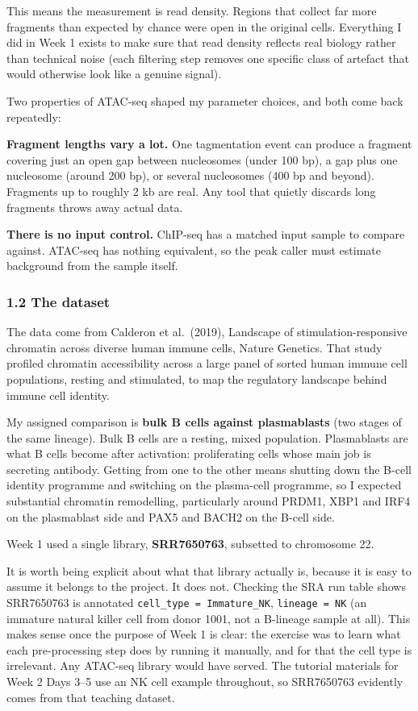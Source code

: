 \documentclass[
  11pt,
  a4paper,
]{article}
\begin{document}
This means the measurement is read density. Regions that collect far
more fragments than expected by chance were open in the original cells.
Everything I did in Week 1 exists to make sure that read density
reflects real biology rather than technical noise (each filtering step
removes one specific class of artefact that would otherwise look like a
genuine signal).

Two properties of ATAC-seq shaped my parameter choices, and both come
back repeatedly:

\textbf{Fragment lengths vary a lot.} One tagmentation event can produce
a fragment covering just an open gap between nucleosomes (under 100 bp),
a gap plus one nucleosome (around 200 bp), or several nucleosomes (400
bp and beyond). Fragments up to roughly 2 kb are real. Any tool that
quietly discards long fragments throws away actual data.

\textbf{There is no input control.} ChIP-seq has a matched input sample
to compare against. ATAC-seq has nothing equivalent, so the peak caller
must estimate background from the sample itself.

\hypertarget{the-dataset}{%
\subsubsection{1.2 The dataset}\label{the-dataset}}

The data come from Calderon et al.~(2019), Landscape of
stimulation-responsive chromatin across diverse human immune cells,
Nature Genetics. That study profiled chromatin accessibility across a
large panel of sorted human immune cell populations, resting and
stimulated, to map the regulatory landscape behind immune cell identity.

My assigned comparison is \textbf{bulk B cells against plasmablasts}
(two stages of the same lineage). Bulk B cells are a resting, mixed
population. Plasmablasts are what B cells become after activation:
proliferating cells whose main job is secreting antibody. Getting from
one to the other means shutting down the B-cell identity programme and
switching on the plasma-cell programme, so I expected substantial
chromatin remodelling, particularly around PRDM1, XBP1 and IRF4 on the
plasmablast side and PAX5 and BACH2 on the B-cell side.

Week 1 used a single library, \textbf{SRR7650763}, subsetted to
chromosome 22.

It is worth being explicit about what that library actually is, because
it is easy to assume it belongs to the project. It does not. Checking
the SRA run table shows SRR7650763 is annotated
\texttt{cell\_type\ =\ Immature\_NK}, \texttt{lineage\ =\ NK} (an
immature natural killer cell from donor 1001, not a B-lineage sample at
all). This makes sense once the purpose of Week 1 is clear: the exercise
was to learn what each pre-processing step does by running it manually,
and for that the cell type is irrelevant. Any ATAC-seq library would
have served. The tutorial materials for Week 2 Days 3--5 use an NK cell
example throughout, so SRR7650763 evidently comes from that teaching
dataset.
\end{document}
